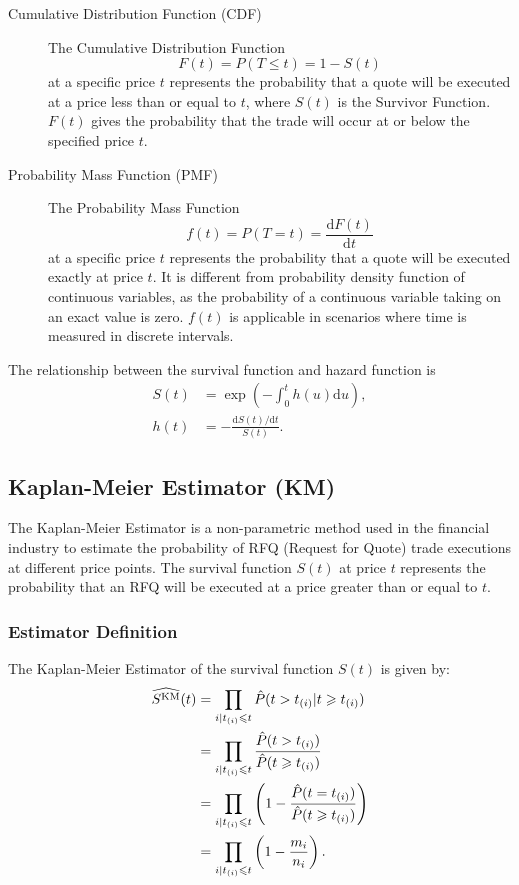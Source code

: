 \begin{description}
    \item[Cumulative Distribution Function (CDF)] The Cumulative Distribution Function 
    \begin{equation}
        F(t) = P(T \leqslant t) = 1 - S(t)\label{eq:cdf}
    \end{equation}
    at a specific price $t$ represents the probability that a quote will be executed at a price less than or equal to $t$, where $S(t)$ is the Survivor Function. $F(t)$ gives the probability that the trade will occur at or below the specified price $t$.
    
    \item[Probability Mass Function (PMF)] The Probability Mass Function
    \begin{equation}
        f(t) = P(T = t) = \frac{\text{d}F(t)}{\text{d}t}\label{eq:pmf}
    \end{equation}
    at a specific price $t$ represents the probability that a quote will be executed exactly at price $t$. It is different from probability density function of continuous variables, as the probability of a continuous variable taking on an exact value is zero. $f(t)$ is applicable in scenarios where time is measured in discrete intervals.
\end{description}

The relationship between the survival function and hazard function is
\begin{align}
    S(t)&= \exp{\left(-\int_{0}^{t}h(u)\text{d}u\right)},\label{eq:h_s}\\
    h(t)&= -\frac{\text{d}S(t)/\text{d}t}{S(t)}.\label{eq:s_h}
\end{align}

\subsection{Kaplan-Meier Estimator (KM)}
The Kaplan-Meier Estimator is a non-parametric method used in the financial industry to estimate the probability of RFQ (Request for Quote) trade executions at different price points. The survival function $S(t)$ at price $t$ represents the probability that an RFQ will be executed at a price greater than or equal to $t$.

\subsubsection{Estimator Definition}
The Kaplan-Meier Estimator of the survival function $S(t)$ is given by:
\begin{align}
    \widehat {S^{\text{KM}}}(t) &= \prod_{i|t_{(i)} \leqslant t} \hat P(t > t_{(i)} | t \geqslant t_{(i)}) \notag\\
    &= \prod_{i|t_{(i)} \leqslant t} \frac{\hat P(t > t_{(i)})}{\hat P(t \geqslant t_{(i)})} \notag\\
    &= \prod_{i|t_{(i)} \leqslant t} \left(1 - \frac{\hat P(t = t_{(i)})}{\hat P(t \geqslant t_{(i)})}\right)\notag\\
    &= \prod_{i|t_{(i)} \leqslant t} \left(1 - \frac{m_i}{n_i}\right).\label{eq:km_sf}
\end{align}

